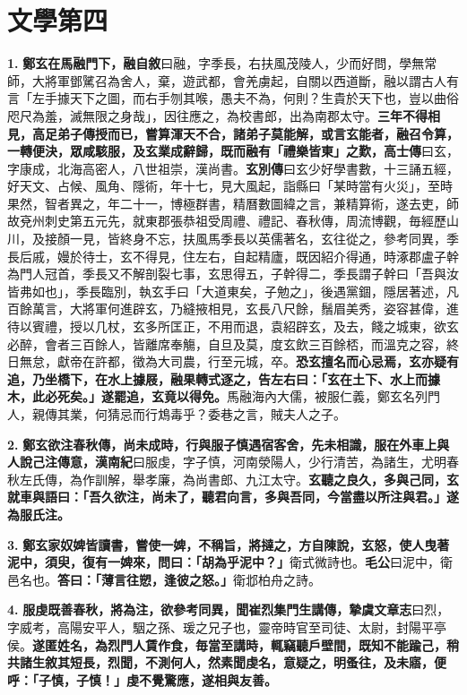 \chapter{文學第四}

\textbf{1.} \textbf{鄭玄在馬融門下，}{\footnotesize \textbf{融自敘}曰融，字季長，右扶風茂陵人，少而好問，學無常師，大將軍鄧騭召為舍人，棄，遊武都，會羌虜起，自關以西道斷，融以謂古人有言「左手據天下之圖，而右手刎其喉，愚夫不為，何則？生貴於天下也，豈以曲俗咫尺為羞，滅無限之身哉」，因往應之，為校書郎，出為南郡太守。}\textbf{三年不得相見，高足弟子傳授而已，嘗算渾天不合，諸弟子莫能解，或言玄能者，融召令算，一轉便決，眾咸駭服，及玄業成辭歸，既而融有「禮樂皆東」之歎，}{\footnotesize \textbf{高士傳}曰玄，字康成，北海高密人，八世祖崇，漢尚書。\textbf{玄別傳}曰玄少好學書數，十三誦五經，好天文、占候、風角、隱術，年十七，見大風起，詣縣曰「某時當有火災」，至時果然，智者異之，年二十一，博極群書，精曆數圖緯之言，兼精算術，遂去吏，師故兗州刺史第五元先，就東郡張恭祖受周禮、禮記、春秋傳，周流博觀，毎經歷山川，及接顏一見，皆終身不忘，扶風馬季長以英儒著名，玄往從之，參考同異，季長后戚，嫚於待士，玄不得見，住左右，自起精廬，既因紹介得通，時涿郡盧子幹為門人冠首，季長又不解剖裂七事，玄思得五，子幹得二，季長謂子幹曰「吾與汝皆弗如也」，季長臨別，執玄手曰「大道東矣，子勉之」，後遇黨錮，隱居著述，凡百餘萬言，大將軍何進辟玄，乃縫掖相見，玄長八尺餘，鬚眉美秀，姿容甚偉，進待以賓禮，授以几杖，玄多所匡正，不用而退，袁紹辟玄，及去，餞之城東，欲玄必醉，會者三百餘人，皆離席奉觴，自旦及莫，度玄飲三百餘桮，而溫克之容，終日無怠，獻帝在許都，徵為大司農，行至元城，卒。}\textbf{恐玄擅名而心忌焉，玄亦疑有追，乃坐橋下，在水上據屐，融果轉式逐之，告左右曰：「玄在土下、水上而據木，此必死矣。」遂罷追，玄竟以得免。}{\footnotesize 馬融海內大儒，被服仁義，鄭玄名列門人，親傳其業，何猜忌而行鴆毒乎？委巷之言，賊夫人之子。}

\textbf{2.} \textbf{鄭玄欲注春秋傳，尚未成時，行與服子慎遇宿客舍，先未相識，服在外車上與人說己注傳意，}{\footnotesize \textbf{漢南紀}曰服虔，字子慎，河南滎陽人，少行清苦，為諸生，尤明春秋左氏傳，為作訓解，舉孝廉，為尚書郎、九江太守。}\textbf{玄聽之良久，多與己同，玄就車與語曰：「吾久欲注，尚未了，聽君向言，多與吾同，今當盡以所注與君。」遂為服氏注。}

\textbf{3.} \textbf{鄭玄家奴婢皆讀書，嘗使一婢，不稱旨，將撻之，方自陳說，玄怒，使人曳著泥中，須臾，復有一婢來，問曰：「胡為乎泥中？」}{\footnotesize 衛式微詩也。\textbf{毛公}曰泥中，衛邑名也。}\textbf{答曰：「薄言往愬，逢彼之怒。」}{\footnotesize 衛邶柏舟之詩。}

\textbf{4.} \textbf{服虔既善春秋，將為注，欲參考同異，聞崔烈集門生講傳，}{\footnotesize \textbf{摯虞文章志}曰烈，字威考，高陽安平人，駰之孫、瑗之兄子也，靈帝時官至司徒、太尉，封陽平亭侯。}\textbf{遂匿姓名，為烈門人賃作食，毎當至講時，輒竊聽戶壁間，既知不能踰己，稍共諸生敘其短長，烈聞，不測何人，然素聞虔名，意疑之，明蚤往，及未寤，便呼：「子慎，子慎！」虔不覺驚應，遂相與友善。}

